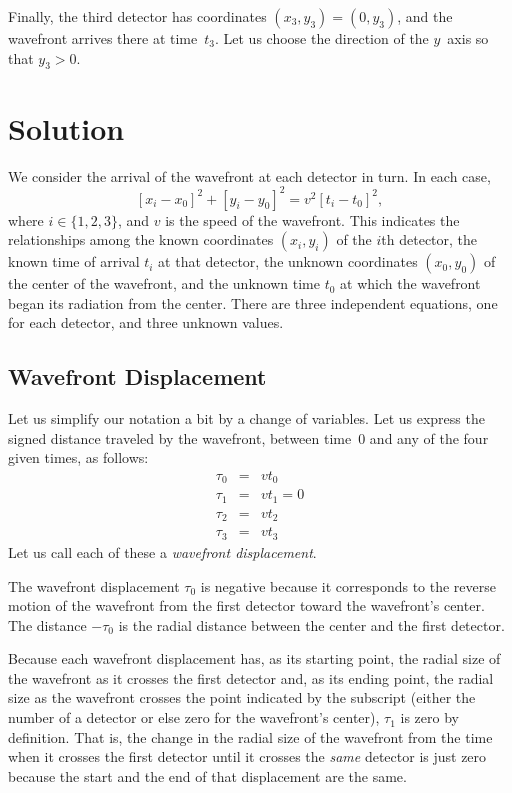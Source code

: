 \documentclass[twocolumn]{article}
\begin{document}
Finally, the third detector has coordinates $(x_3, y_3) = (0, y_3)$, and the
wavefront arrives there at time~$t_3$.  Let us choose the direction of the
$y$~axis so that $y_3 > 0$.

\section{Solution}

We consider the arrival of the wavefront at each detector in turn.  In each
case,
\begin{equation}
   \left[x_i - x_0\right]^2 + \left[y_i - y_0\right]^2 = v^2 \left[t_i -
   t_0\right]^2,
\end{equation}
where $i \in \{1, 2, 3\}$, and $v$ is the speed of the wavefront.  This
indicates the relationships among the known coordinates $(x_i, y_i)$ of the
$i$th detector, the known time of arrival $t_i$ at that detector, the unknown
coordinates $(x_0, y_0)$ of the center of the wavefront, and the unknown time
$t_0$ at which the wavefront began its radiation from the center.  There are
three independent equations, one for each detector, and three unknown values.

\subsection{Wavefront Displacement}

Let us simplify our notation a bit by a change of variables.  Let us express
the signed distance traveled by the wavefront, between time~0 and any of the
four given times, as follows:
\begin{eqnarray}
   \tau_0 &=& vt_0\\
   \tau_1 &=& vt_1 = 0\\
   \tau_2 &=& vt_2\\
   \tau_3 &=& vt_3
\end{eqnarray}
Let us call each of these a \emph{wavefront displacement}.

The wavefront displacement $\tau_0$ is negative because it corresponds to the
reverse motion of the wavefront from the first detector toward the wavefront's
center.  The distance $-\tau_0$ is the radial distance between the center and
the first detector.

Because each wavefront displacement has, as its starting point, the radial size
of the wavefront as it crosses the first detector and, as its ending point, the
radial size as the wavefront crosses the point indicated by the subscript
(either the number of a detector or else zero for the wavefront's center),
$\tau_1$ is zero by definition.  That is, the change in the radial size of the
wavefront from the time when it crosses the first detector until it crosses the
\emph{same} detector is just zero because the start and the end of that
displacement are the same.
\end{document}
